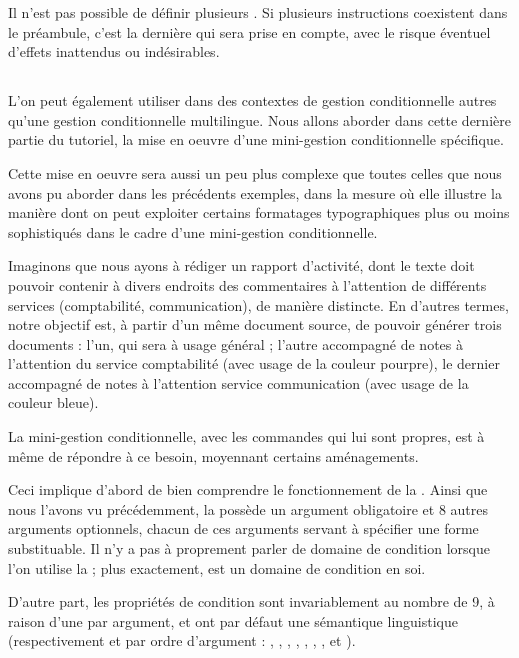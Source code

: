 \documentclass{article}
\begin{document}
Il n'est pas possible de définir plusieurs . Si plusieurs instructions  coexistent dans le préambule, c'est la dernière qui sera prise en compte, avec le risque éventuel d'effets inattendus ou indésirables.

\subsection{}
L'on peut également utiliser  dans des contextes de gestion conditionnelle autres qu'une gestion conditionnelle multilingue. Nous allons aborder dans cette dernière partie du tutoriel, la mise en oeuvre d'une mini-gestion conditionnelle spécifique.

Cette mise en oeuvre sera aussi un peu plus complexe que toutes celles que nous avons pu aborder dans les précédents exemples, dans la mesure où elle illustre la manière dont on peut exploiter certains formatages typographiques plus ou moins sophistiqués dans le cadre d'une mini-gestion conditionnelle.

Imaginons que nous ayons à rédiger un rapport d'activité, dont le texte doit pouvoir contenir à divers endroits des commentaires à l'attention de différents services (comptabilité, communication), de manière distincte. En d'autres termes, notre objectif est, à partir d'un même document source, de pouvoir générer trois documents : l'un, qui sera à usage général ;  l'autre accompagné de notes à l'attention du service comptabilité (avec usage de la couleur pourpre), le dernier accompagné de notes à l'attention service communication (avec usage de la couleur bleue).

La mini-gestion conditionnelle, avec les commandes qui lui sont propres, est à même de répondre à ce besoin, moyennant certains aménagements.

Ceci implique d'abord de bien comprendre le fonctionnement de la . Ainsi que nous l'avons vu précédemment, la  possède un argument obligatoire et 8 autres arguments optionnels, chacun de ces arguments servant à spécifier une forme substituable. Il n'y a pas à proprement parler de domaine de condition lorsque l'on utilise la  ; plus exactement,  est un domaine de condition en soi.

D'autre part, les propriétés de condition sont invariablement au nombre de 9, à raison d'une par argument, et ont par défaut une sémantique linguistique (respectivement et par ordre d'argument : , ,  ,  ,  ,  ,  ,   et ).
\end{document}
